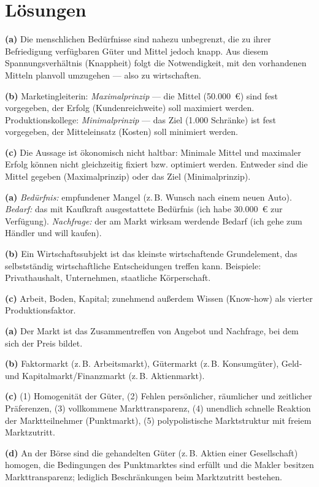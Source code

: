 \documentclass[11pt, a4paper]{article}
\begin{document}
\newpage
\section{Lösungen}\label{loesungen}

\begin{loesung}[title={Lösung Aufgabe~1 --- Ökonomisches Prinzip}]
\textbf{(a)} Die menschlichen Bedürfnisse sind nahezu unbegrenzt, die zu ihrer Befriedigung
verfügbaren Güter und Mittel jedoch knapp. Aus diesem Spannungsverhältnis (Knappheit) folgt
die Notwendigkeit, mit den vorhandenen Mitteln planvoll umzugehen --- also zu wirtschaften.

\textbf{(b)} Marketingleiterin: \emph{Maximalprinzip} --- die Mittel (50.000~€) sind fest
vorgegeben, der Erfolg (Kundenreichweite) soll maximiert werden. Produktionskollege:
\emph{Minimalprinzip} --- das Ziel (1.000 Schränke) ist fest vorgegeben, der Mitteleinsatz
(Kosten) soll minimiert werden.

\textbf{(c)} Die Aussage ist ökonomisch nicht haltbar: Minimale Mittel und maximaler Erfolg
können nicht gleichzeitig fixiert bzw. optimiert werden. Entweder sind die Mittel gegeben
(Maximalprinzip) oder das Ziel (Minimalprinzip).
\end{loesung}

\begin{loesung}[title={Lösung Aufgabe~2 --- Grundbegriffe}]
\textbf{(a)} \emph{Bedürfnis:} empfundener Mangel (z.\,B. Wunsch nach einem neuen Auto).
\emph{Bedarf:} das mit Kaufkraft ausgestattete Bedürfnis (ich habe 30.000~€ zur Verfügung).
\emph{Nachfrage:} der am Markt wirksam werdende Bedarf (ich gehe zum Händler und will
kaufen).

\textbf{(b)} Ein Wirtschaftssubjekt ist das kleinste wirtschaftende Grundelement, das
selbstständig wirtschaftliche Entscheidungen treffen kann. Beispiele: Privathaushalt,
Unternehmen, staatliche Körperschaft.

\textbf{(c)} Arbeit, Boden, Kapital; zunehmend außerdem Wissen (Know-how) als vierter
Produktionsfaktor.
\end{loesung}

\begin{loesung}[title={Lösung Aufgabe~3 --- Marktarten und vollkommener Markt}]
\textbf{(a)} Der Markt ist das Zusammentreffen von Angebot und Nachfrage, bei dem sich der
Preis bildet.

\textbf{(b)} Faktormarkt (z.\,B. Arbeitsmarkt), Gütermarkt (z.\,B. Konsumgüter),
Geld- und Kapitalmarkt/Finanzmarkt (z.\,B. Aktienmarkt).

\textbf{(c)} (1) Homogenität der Güter, (2) Fehlen persönlicher, räumlicher und zeitlicher
Präferenzen, (3) vollkommene Markttransparenz, (4) unendlich schnelle Reaktion der
Marktteilnehmer (Punktmarkt), (5) polypolistische Marktstruktur mit freiem Marktzutritt.

\textbf{(d)} An der Börse sind die gehandelten Güter (z.\,B. Aktien einer Gesellschaft)
homogen, die Bedingungen des Punktmarktes sind erfüllt und die Makler besitzen
Markttransparenz; lediglich Beschränkungen beim Marktzutritt bestehen.
\end{loesung}
\end{document}
